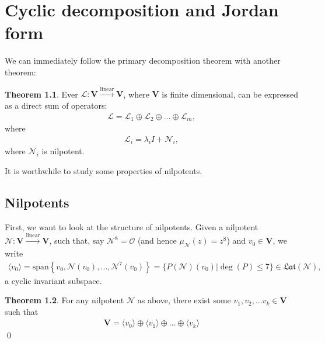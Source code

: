 \documentclass{book}
\theoremstyle{definition}
\newtheorem{thm}{Theorem}[section]
\newcommand{\V}{\mathbf{V}}
\newcommand{\xpan}{\text{span}}
\newcommand{\lag}{\mathcal{L}}
\newcommand{\lin}{\overset{\text{linear}}{\longrightarrow}}
\begin{document}
\newpage 
\chapter{Cyclic decomposition and Jordan form}

We can immediately follow the primary decomposition theorem with another theorem:

\begin{thm}
	Ever $\lag : \V \lin \V$, where $\V$ is finite dimensional, can be expressed as a direct sum of operators:
	\begin{align*}
	\lag = \lag_1 \oplus \lag_2 \oplus \dots \oplus \lag_m,
	\end{align*}
	where 
	\begin{align*}
	\lag_i = \lambda_i I + \mathcal{N}_i,
	\end{align*}
	where $\mathcal{N}_i$ is nilpotent. 
\end{thm}

It is worthwhile to study some properties of nilpotents.

\section{Nilpotents}

First, we want to look at the structure of nilpotents. Given a nilpotent $\mathcal{N} : \V \lin \V$, such that, say $\mathcal{N}^8 = \mathcal{O}$ (and hence $\mu_\mathcal{N}(z) = z^8$) and $v_0 \in \V$, we write
\begin{align*}
\langle v_0 \rangle = \xpan \left\{ v_0 ,\mathcal{N}(v_0),\dots, \mathcal{N}^7(v_0) \right\} = \{ P(\mathcal{N})(v_0) \big\vert \deg(P) \leq 7 \} \in \mathfrak{Lat}(\mathcal{N}),
\end{align*}
a cyclic invariant subspace. 

\begin{thm}
	For any nilpotent $\mathcal{N}$ as above, there exist some $v_1, v_2,\dots v_k \in \V$ such that 
	\begin{align*}
	\V = \langle v_0 \rangle \oplus \langle v_1 \rangle \oplus \dots \oplus \langle v_k \rangle
	\end{align*} \qed
\end{thm}
\end{document}
